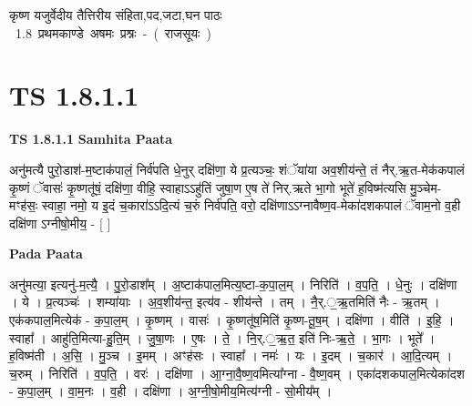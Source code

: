 \documentclass[17pt]{extarticle}
\begin{document}
\begin{titlepage}
    \begin{center}
 
\begin{sanskrit}
    { \Huge
    कृष्ण यजुर्वेदीय तैत्तिरीय संहिता,पद,जटा,घन पाठः 
    }
    \\
    \vspace{2.5cm}
    \mbox{ \Huge
    1.8     प्रथमकाण्डे अषमः प्रश्नः - ( राजसूयः )   }
\end{sanskrit}
\end{center}

\end{titlepage}
\tableofcontents
\pagebreak

\section*{ TS 1.8.1.1 }

\textbf{TS 1.8.1.1 } \newline
\textbf{Samhita Paata} \newline

अनु॑मत्यै पुरो॒डाश॑-म॒ष्टाक॑पालं॒ निर्व॑पति धे॒नुर् दक्षि॑णा॒ ये प्र॒त्यञ्चः॒ शंॅया॑या अव॒शीय॑न्ते॒ तं नैर्.ऋ॒त-मेक॑कपालं कृ॒ष्णं ॅवासः॑ कृ॒ष्णतू॑षं॒ दक्षि॑णा॒ वीहि॒ स्वाहाऽऽहु॑तिं जुषा॒ण ए॒ष ते॑ निर्.ऋते भा॒गो भूते॑ ह॒विष्म॑त्यसि मु॒ञ्चेम-मꣳह॑सः॒ स्वाहा॒ नमो॒ य इ॒दं च॒कारा॑ऽऽदि॒त्यं च॒रुं निर्व॑पति॒ वरो॒ दक्षि॑णाऽऽग्नावैष्ण॒व-मेका॑दशकपालं ॅवाम॒नो व॒ही दक्षि॑णा ऽग्नीषो॒मीय॒ - [ ] \newline

\textbf{Pada Paata} \newline

अनु॑मत्या॒ इत्यनु॑-म॒त्यै॒ । पु॒रो॒डाश᳚म् । अ॒ष्टाक॑पाल॒मित्य॒ष्टा-क॒पा॒ल॒म् । निरिति॑ । व॒प॒ति॒ । धे॒नुः । दक्षि॑णा । ये । प्र॒त्यञ्चः॑ । शम्या॑याः । अ॒व॒शीय॑न्त॒ इत्य॑व - शीय॑न्ते । तम् । नै॒र्.॒ऋ॒तमिति॑ नैः - ऋ॒तम् । एक॑कपाल॒मित्येक॑ - क॒पा॒ल॒म् । कृ॒ष्णम् । वासः॑ । कृ॒ष्णतू॑ष॒मिति॑ कृ॒ष्ण-तू॒ष॒म् । दक्षि॑णा । वीति॑ । इ॒हि॒ । स्वाहा᳚ । आहु॑ति॒मित्या-हु॒ति॒म् । जु॒षा॒णः । ए॒षः । ते॒ । नि॒र्.॒ऋ॒त॒ इति॑ निः-ऋ॒ते॒ । भा॒गः । भूते᳚ । ह॒विष्म॑ती । अ॒सि॒ । मु॒ञ्च । इ॒मम् । अꣳह॑सः । स्वाहा᳚ । नमः॑ । यः । इ॒दम् । च॒कार॑ । आ॒दि॒त्यम् । च॒रुम् । निरिति॑ । व॒प॒ति॒ । वरः॑ । दक्षि॑णा । आ॒ग्ना॒वै॒ष्ण॒वमित्या᳚ग्ना - वै॒ष्ण॒वम् । एका॑दशकपाल॒मित्येका॑दश - क॒पा॒ल॒म् । वा॒म॒नः । व॒ही । दक्षि॑णा । अ॒ग्नी॒षो॒मीय॒मित्य॑ग्नी - सो॒मीय᳚म् ।  \newline
\end{document}
